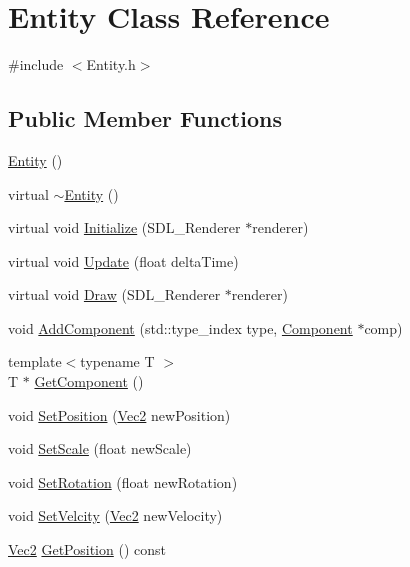 \hypertarget{class_entity}{}\section{Entity Class Reference}
\label{class_entity}


{\ttfamily \#include $<$Entity.\+h$>$}

\subsection*{Public Member Functions}
\begin{DoxyCompactItemize}
\item 
\mbox{\hyperlink{class_entity_a980f368aa07ce358583982821533a54a}{Entity}} ()
\item 
virtual \mbox{\hyperlink{class_entity_adf6d3f7cb1b2ba029b6b048a395cc8ae}{$\sim$\+Entity}} ()
\item 
virtual void \mbox{\hyperlink{class_entity_a29ff4d8c00040f1aa281f2e039256543}{Initialize}} (S\+D\+L\+\_\+\+Renderer $\ast$renderer)
\item 
virtual void \mbox{\hyperlink{class_entity_a64043a3f77405466222ff997e272924f}{Update}} (float delta\+Time)
\item 
virtual void \mbox{\hyperlink{class_entity_aae4367e01c9e539bc016b6ffa8dcf3d5}{Draw}} (S\+D\+L\+\_\+\+Renderer $\ast$renderer)
\item 
void \mbox{\hyperlink{class_entity_ae4af7f884155869ae624c5668d67d4e5}{Add\+Component}} (std\+::type\+\_\+index type, \mbox{\hyperlink{class_component}{Component}} $\ast$comp)
\item 
{\footnotesize template$<$typename T $>$ }\\T $\ast$ \mbox{\hyperlink{class_entity_a0084a74b2e2a363e4d3224d1877b9cf3}{Get\+Component}} ()
\item 
void \mbox{\hyperlink{class_entity_ae4b8c446f4e75b6b531768bc12832276}{Set\+Position}} (\mbox{\hyperlink{struct_vec2}{Vec2}} new\+Position)
\item 
void \mbox{\hyperlink{class_entity_a096b2532f1357c05b7b45deed900ca2a}{Set\+Scale}} (float new\+Scale)
\item 
void \mbox{\hyperlink{class_entity_a83f149284da6f4dba4274de5c37a408c}{Set\+Rotation}} (float new\+Rotation)
\item 
void \mbox{\hyperlink{class_entity_ade1dea9daf20aeaf47fef4f0126a2860}{Set\+Velcity}} (\mbox{\hyperlink{struct_vec2}{Vec2}} new\+Velocity)
\item 
\mbox{\hyperlink{struct_vec2}{Vec2}} \mbox{\hyperlink{class_entity_aed198c25368025ba9ff9768f17f19e9e}{Get\+Position}} () const

\end{DoxyCompactItemize}
